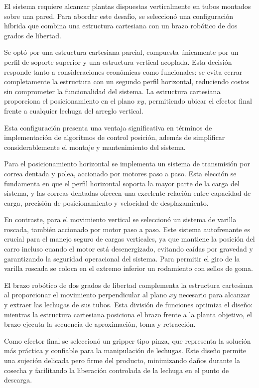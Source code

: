 El sistema requiere alcanzar plantas dispuestas verticalmente en tubos montados sobre una pared. Para abordar este desafío, se seleccionó una configuración híbrida que combina una estructura cartesiana con un brazo robótico de dos grados de libertad.

Se optó por una estructura cartesiana parcial, compuesta únicamente por un perfil de soporte superior y una estructura vertical acoplada. Esta decisión responde tanto a consideraciones económicas como funcionales: se evita cerrar completamente la estructura con un segundo perfil horizontal, reduciendo costos sin comprometer la funcionalidad del sistema. La estructura cartesiana proporciona el posicionamiento en el plano $xy$, permitiendo ubicar el efector final frente a cualquier lechuga del arreglo vertical.

Esta configuración presenta una ventaja significativa en términos de implementación de algoritmos de control posición, además de simplificar considerablemente el montaje y mantenimiento del sistema.

Para el posicionamiento horizontal se implementa un sistema de transmisión por correa dentada y polea, accionado por motores paso a paso. Esta elección se fundamenta en que el perfil horizontal soporta la mayor parte de la carga del sistema, y las correas dentadas ofrecen una excelente relación entre capacidad de carga, precisión de posicionamiento y velocidad de desplazamiento.

En contraste, para el movimiento vertical se seleccionó un sistema de varilla roscada, también accionado por motor paso a paso. Este sistema autofrenante es crucial para el manejo seguro de cargas verticales, ya que mantiene la posición del carro incluso cuando el motor está desenergizado, evitando caídas por gravedad y garantizando la seguridad operacional del sistema. Para permitir el giro de la varilla roscada se coloca en el extremo inferior un rodamiento con sellos de goma.

El brazo robótico de dos grados de libertad complementa la estructura cartesiana al proporcionar el movimiento perpendicular al plano $xy$ necesario para alcanzar y extraer las lechugas de sus tubos. Esta división de funciones optimiza el diseño: mientras la estructura cartesiana posiciona el brazo frente a la planta objetivo, el brazo ejecuta la secuencia de aproximación, toma y retracción.

Como efector final se seleccionó un gripper tipo pinza, que representa la solución más práctica y confiable para la manipulación de lechugas. Este diseño permite una sujeción delicada pero firme del producto, minimizando daños durante la cosecha y facilitando la liberación controlada de la lechuga en el punto de descarga.

